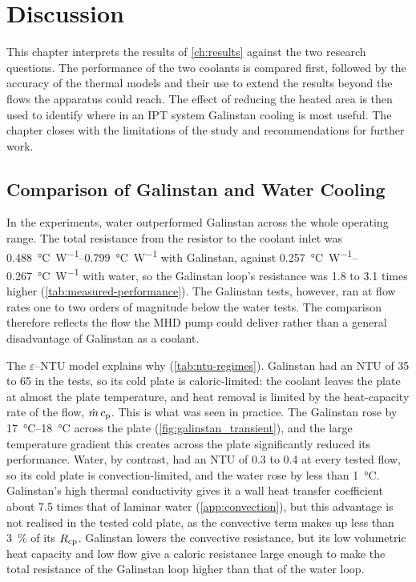 \chapter{Discussion}
\label{sec:discussion}

This chapter interprets the results of \cref{ch:results} against the two
research questions. The performance of the two coolants is compared first,
followed by the accuracy of the thermal models and their use to extend the
results beyond the flows the apparatus could reach. The effect of reducing the
heated area is then used to identify where in an IPT system Galinstan cooling is
most useful. The chapter closes with the limitations of the study and
recommendations for further work.

\section{Comparison of Galinstan and Water Cooling}
\label{sec:disc-performance}

In the experiments, water outperformed Galinstan across the whole operating
range. The total resistance from the resistor to the coolant inlet was
\SIrange{0.488}{0.799}{\celsius\per\watt} with Galinstan, against
\SIrange{0.257}{0.267}{\celsius\per\watt} with water, so the Galinstan loop's
resistance was 1.8 to 3.1 times higher (\cref{tab:measured-performance}). The
Galinstan tests, however, ran at flow rates one to two orders of magnitude
below the water tests. The
comparison therefore reflects the flow the MHD pump could deliver rather than a
general disadvantage of Galinstan as a coolant.

The $\varepsilon$--NTU model explains why (\cref{tab:ntu-regimes}). Galinstan
had an NTU of 35 to 65 in the tests, so its cold plate is caloric-limited: the
coolant leaves the plate at almost the plate temperature, and heat removal is
limited by the heat-capacity rate of the flow, $\dot{m}\,c_{\mathrm{p}}$. This is what was
seen in practice. The Galinstan rose by \SIrange{17}{18}{\celsius} across the
plate (\cref{fig:galinstan_transient}), and the large temperature gradient this
creates across the plate significantly reduced its performance. Water, by
contrast, had an NTU of 0.3 to 0.4 at every tested flow, so its cold plate is
convection-limited, and the water rose by less than \SI{1}{\celsius}. Galinstan's
high thermal conductivity gives it a wall heat transfer coefficient about 7.5
times that of laminar water (\cref{app:convection}), but this advantage is not
realised in the tested cold plate, as the convective term makes up less than
\SI{3}{\percent} of its $R_{\mathrm{cp}}$. Galinstan lowers the
convective resistance, but its low volumetric heat capacity and low flow give a
caloric resistance large enough to make the total resistance of the Galinstan
loop higher than that of the water loop.

